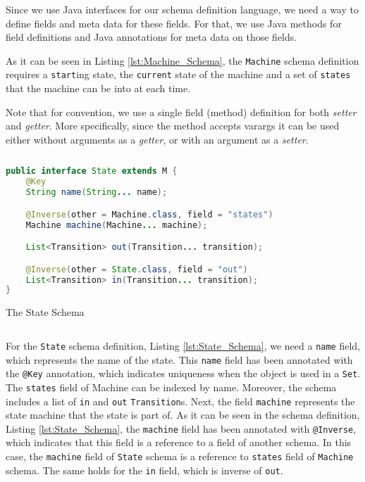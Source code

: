 Since we use Java interfaces for our schema definition language, we need a way to define fields and meta data for these fields.
For that, we use Java methods for field definitions and Java annotations for meta data on those fields.

As it can be seen in Listing \ref{lst:Machine_Schema}, the \texttt{Machine} schema definition requires a \texttt{start}ing state, the \texttt{current} state of the machine and a set of \texttt{states} that the machine can be into at each time.

Note that for convention, we use a single field (method) definition for both \textit{setter} and \textit{getter}.
More specifically, since the method accepts varargs it can be used either without arguments as a \textit{getter}, or with an argument as a \textit{setter}.

\begin{sourcecode}[H]
	\begin{lstlisting}[language=Java,escapechar=|]
public interface State extends M {
	@Key
	String name(String... name);

	@Inverse(other = Machine.class, field = "states")
	Machine machine(Machine... machine);

	List<Transition> out(Transition... transition);

	@Inverse(other = State.class, field = "out")
	List<Transition> in(Transition... transition);
}
	\end{lstlisting}
	\caption{The State Schema}
	\label{lst:State_Schema}
\end{sourcecode}

For the \texttt{State} schema definition, Listing \ref{lst:State_Schema}, we need a \texttt{name} field, which represents the name of the state. 
This \texttt{name} field has been annotated with the \texttt{@Key} annotation, which indicates uniqueness when the object is used in a \texttt{Set}. 
The \texttt{states} field of Machine can be indexed by name.
Moreover, the schema includes a list of \texttt{in} and \texttt{out} \texttt{Transition}s.
Next, the field \texttt{machine} represents the state machine that the state is part of. 
As it can be seen in the schema definition, Listing \ref{lst:State_Schema}, the \texttt{machine} field has been annotated with \texttt{@Inverse}, which indicates that this field is a reference to a field of another schema.
In this case, the \texttt{machine} field of \texttt{State} schema is a reference to \texttt{states} field of \texttt{Machine} schema.
The same holds for the \texttt{in} field, which is inverse of \texttt{out}.


